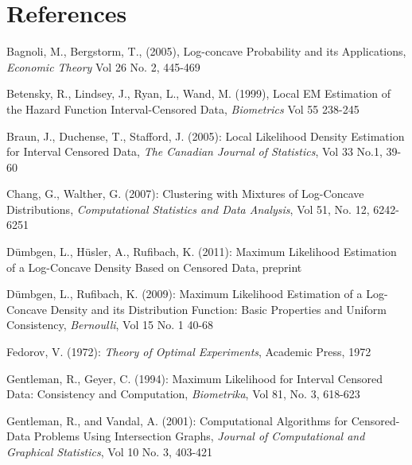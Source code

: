 \documentclass[10pt]{article}
\begin{document}
	
{\section{References} }

Bagnoli, M., Bergstorm, T., (2005), Log-concave Probability and its Applications, \emph{Economic Theory} Vol 26 No. 2, 445-469

\vspace{3mm}

Betensky, R., Lindsey, J., Ryan, L., Wand, M. (1999), Local EM Estimation of the Hazard Function Interval-Censored Data, \emph{Biometrics} Vol 55 238-245

\vspace{3mm}

Braun, J., Duchense, T., Stafford, J. (2005): Local Likelihood Density Estimation for Interval Censored Data, \emph{The Canadian Journal of Statistics}, Vol 33 No.1, 39-60

\vspace{3mm}

Chang, G., Walther, G. (2007): Clustering with Mixtures of Log-Concave Distributions, \emph{Computational Statistics and Data Analysis}, Vol 51, No. 12, 6242-6251

\vspace{3mm}

D\"umbgen, L., H\"usler, A., Rufibach, K. (2011): Maximum Likelihood Estimation of a Log-Concave Density Based on Censored Data, preprint

\vspace{3mm}

D\"umbgen, L., Rufibach, K. (2009): Maximum Likelihood Estimation of a Log-Concave Density and its Distribution Function: Basic Properties and Uniform Consistency, \emph{Bernoulli}, Vol 15 No. 1 40-68

\vspace{3mm} 

Fedorov, V. (1972): \emph{Theory of Optimal Experiments}, Academic Press, 1972 

\vspace{3mm}

Gentleman, R., Geyer, C. (1994): Maximum Likelihood for Interval Censored Data: Consistency and Computation, \emph{Biometrika}, Vol 81, No. 3, 618-623

\vspace{3mm}

Gentleman, R., and Vandal, A. (2001): Computational Algorithms for Censored-Data Problems Using Intersection Graphs, \emph{Journal of Computational and Graphical Statistics}, Vol 10 No. 3, 403-421
\end{document}

